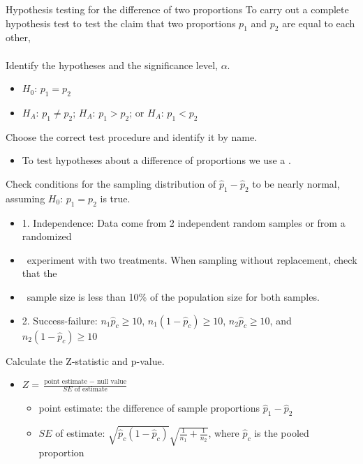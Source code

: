  

\begin{onebox}{Hypothesis testing for the difference of two proportions}
To carry out a complete hypothesis test to test the claim that two proportions $p_1$ and $p_2$ are equal to each other,
\\
\\
 Identify the hypotheses and the significance level, $\alpha$.
\begin{itemize}\vspace{-1mm}
\setlength{\itemsep}{0mm}
\item[] $H_0$: $p_1=p_2$ 
\item[] $H_A$: $p_1\ne p_2$; \quad $H_A$: $p_1>p_2$; \quad or \quad $H_A$: $p_1<p_2$ 
\end{itemize}
  Choose the correct test procedure and identify it by name.\vspace{-1mm}
\begin{itemize}
\item[] To test hypotheses about a difference of proportions we use a .  
\end{itemize}
  Check conditions for the sampling distribution of $\hat{p}_1-\hat{p}_2$ to be nearly normal, assuming $H_0$: $p_1=p_2$ is true.\vspace{-1mm}
\begin{itemize}
\setlength{\itemsep}{0mm}
\item[] 1.  Independence:  Data come from 2 independent random samples or from a randomized 
\item[] \quad \ experiment with two treatments.  When sampling without replacement, check that the 
\item[] \quad \  sample size is less than 10\% of the population size for both samples.
\item[] 2.  Success-failure: $n_1\hat{p}_c\geq 10$, $n_1(1-\hat{p}_c)\geq 10$, $n_2\hat{p}_c\geq 10$, and $n_2(1-\hat{p}_c)\geq 10$
\end{itemize}
   Calculate the Z-statistic and p-value.
\begin{itemize}
\item[] $Z = \frac{\text{point estimate } - \text{ null value}}{SE \text{ of estimate}}$
\begin{itemize}
\item[] point estimate: the difference of sample proportions $\hat{p}_1 - \hat{p}_2$
\item[] $SE$ of estimate:  $\sqrt{\hat{p}_c(1-\hat{p}_c)}\sqrt{\frac{1}{n_1} + \frac{1}{n_2}}$, where $\hat{p}_c$ is the pooled proportion

\end{itemize}
\end{itemize}
\end{onebox}
